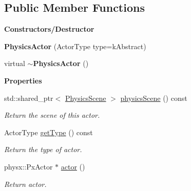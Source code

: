 \subsection*{Public Member Functions}
\begin{Indent}\textbf{ Constructors/\+Destructor}\par
\begin{DoxyCompactItemize}
\item 
\mbox{\label{classrev_1_1_physics_actor_a27ac888969d9a98dfcfe4c5c2831e519}} 
{\bfseries Physics\+Actor} (Actor\+Type type=k\+Abstract)
\item 
\mbox{\label{classrev_1_1_physics_actor_a6ab167549d7516a314c9276dc16e4b01}} 
virtual {\bfseries $\sim$\+Physics\+Actor} ()
\end{DoxyCompactItemize}
\end{Indent}
\begin{Indent}\textbf{ Properties}\par
\begin{DoxyCompactItemize}
\item 
\mbox{\label{classrev_1_1_physics_actor_a67f0180b75ff455b4e86ffe0e291a900}} 
std\+::shared\+\_\+ptr$<$ \mbox{\hyperlink{classrev_1_1_physics_scene}{Physics\+Scene}} $>$ \mbox{\hyperlink{classrev_1_1_physics_actor_a67f0180b75ff455b4e86ffe0e291a900}{physics\+Scene}} () const
\begin{DoxyCompactList}\small\item\em Return the scene of this actor. \end{DoxyCompactList}\item 
\mbox{\label{classrev_1_1_physics_actor_a7cd4818364d95ad8824d18711708a2ab}} 
Actor\+Type \mbox{\hyperlink{classrev_1_1_physics_actor_a7cd4818364d95ad8824d18711708a2ab}{get\+Type}} () const
\begin{DoxyCompactList}\small\item\em Return the type of actor. \end{DoxyCompactList}\item 
\mbox{\label{classrev_1_1_physics_actor_a2ac178323d0311b888367272ddf875c0}} 
physx\+::\+Px\+Actor $\ast$ \mbox{\hyperlink{classrev_1_1_physics_actor_a2ac178323d0311b888367272ddf875c0}{actor}} ()
\begin{DoxyCompactList}\small\item\em Return actor. \end{DoxyCompactList}\end{DoxyCompactItemize}
\end{Indent}
